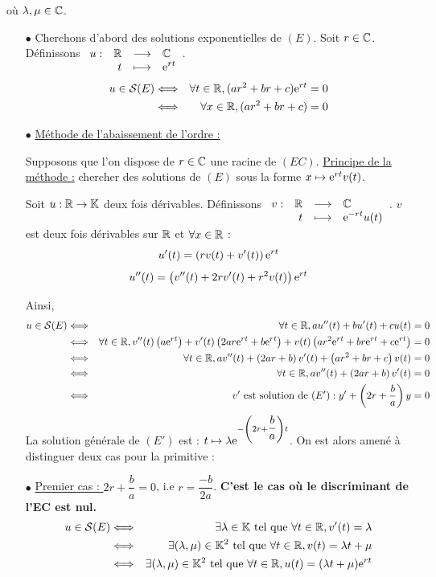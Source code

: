 \documentclass{magnolia}
\begin{document}
\begin{preuve}
\begin{francois}
\begin{itemize}
où $\lambda,\mu\in\mathbb{C}$.
\end{itemize}
\end{francois}
\begin{victor}
\begin{itemize}
\item [$\bullet$] Cherchons d'abord des solutions exponentielles de $(E)$. Soit $r\in \mathbb{C}$. Définissons $\begin{array}[t]{lrcl} \displaystyle{u} : & \displaystyle{\mathbb{R}} & \longrightarrow & \displaystyle{\mathbb{C}} \\ & \displaystyle{t} & \longmapsto & \displaystyle{{\rm e}^{rt}} \end{array}$.
\begin{eqnarray*}
u \in \mathcal{S}(E) &\Longleftrightarrow& \forall t\in \mathbb{R}, (ar^2+br+c){\rm e}^{rt}=0\\
&\Longleftrightarrow& \forall x\in \mathbb{R}, (ar^2+br+c)=0
\end{eqnarray*}
\item [$\bullet$] \underline{Méthode de l'abaissement de l'ordre :}

Supposons que l'on dispose de $r\in\mathbb{C}$ une racine de $(EC)$. \underline{Principe de la méthode :} chercher des solutions de $(E)$ sous la forme $x\mapsto {\rm e}^{rt}v(t)$.

Soit $u:\mathbb{R}\to \mathbb{K}$ deux fois dérivables. Définissons $\begin{array}[t]{lrcl} \displaystyle{v} : & \displaystyle{\mathbb{R}} & \longrightarrow & \displaystyle{\mathbb{C}} \\ & \displaystyle{t} & \longmapsto & \displaystyle{{\rm e}^{-rt}u(t)} \end{array}$. $v$ est deux fois dérivables sur $\mathbb{R}$ et $\forall x\in\mathbb{R}$ :
\[u'(t)=\left(rv(t)+v'(t)\right){\rm e}^{rt}\]
\[u''(t)=\left(v''(t)+2rv'(t)+r^2v(t)\right){\rm e}^{rt}\]

Ainsi,
\begin{eqnarray*}
u\in \mathcal{S}(E)&\Longleftrightarrow & \forall t\in \mathbb{R}, au''(t)+bu'(t)+cu(t)=0\\
&\Longleftrightarrow & \forall t\in \mathbb{R}, v''(t)\left(a{\rm e}^{rt}\right)+v'(t)\left(2ar{\rm e}^{rt}+b{\rm e}^{rt}\right)+v(t)\left(ar^2{\rm e}^{rt}+br{\rm e}^{rt}+c{\rm e}^{rt}\right)=0\\
&\Longleftrightarrow & \forall t\in \mathbb{R}, av''(t)+\left(2ar+b\right)v'(t)+\left(ar^2+br+c\right)v(t)=0\\
&\Longleftrightarrow & \forall t\in \mathbb{R}, av''(t)+\left(2ar+b\right)v'(t)=0\\
&\Longleftrightarrow & v' \text{ est solution de } (E') : y'+\left(2r+\dfrac{b}{a}\right)y=0
\end{eqnarray*}
La solution générale de $(E')$ est : $t\mapsto \lambda {\rm e}^{-\left(2r+\dfrac{b}{a}\right)t}$. On est alors amené à distinguer deux cas pour la primitive :

\item [$\bullet$] \underline{Premier cas : } $2r+\dfrac{b}{a}=0$, i.e $r=\dfrac{-b}{2a}$. \textbf{C'est le cas où le discriminant de l'EC est nul.}
\begin{eqnarray*}
u\in \mathcal{S}(E)&\Longleftrightarrow & \exists \lambda\in\mathbb{K} \text{ tel que } \forall t \in \mathbb{R}, v'(t)=\lambda\\
&\Longleftrightarrow & \exists (\lambda,\mu)\in\mathbb{K}^2 \text{ tel que } \forall t \in \mathbb{R}, v(t)=\lambda t+\mu\\
&\Longleftrightarrow & \exists (\lambda,\mu)\in\mathbb{K}^2 \text{ tel que } \forall t \in \mathbb{R}, u(t)=(\lambda t+\mu){\rm e}^{rt}
\end{eqnarray*}


\end{itemize}
\end{victor}
\end{preuve}
\end{document}
